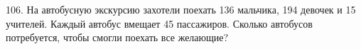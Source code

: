 106. На автобусную экскурсию захотели поехать 136 мальчика, 194 девочек и 15 учителей. Каждый автобус вмещает 45 пассажиров. Сколько автобусов потребуется, чтобы смогли поехать все желающие?\\
